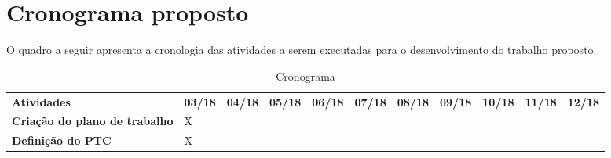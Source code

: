 \chapter{Cronograma proposto}

O quadro a seguir apresenta a cronologia das atividades a serem executadas para o desenvolvimento do trabalho proposto.


\begin{table}[h]
\caption{Cronograma}
 \centering
 {\renewcommand\arraystretch{1.25}
 \begin{tabular}{ l l l l l l l l l l l }
  \cline{1-1}\cline{2-2}\cline{3-3}\cline{4-4}\cline{5-5}\cline{6-6}\cline{7-7}\cline{8-8}\cline{9-9}\cline{10-10}\cline{11-11}  
    \multicolumn{1}{|p{4.283cm}|}{\textbf{Atividades} \centering } &
    \multicolumn{1}{p{0.709cm}|}{\textbf{03/18} \centering } &
    \multicolumn{1}{p{0.709cm}|}{\textbf{04/18} \centering } &
    \multicolumn{1}{p{0.709cm}|}{\textbf{05/18} \centering } &
    \multicolumn{1}{p{0.709cm}|}{\textbf{06/18} \centering } &
    \multicolumn{1}{p{0.709cm}|}{\textbf{07/18} \centering } &
    \multicolumn{1}{p{0.709cm}|}{\textbf{08/18} \centering } &
    \multicolumn{1}{p{0.709cm}|}{\textbf{09/18} \centering } &
    \multicolumn{1}{p{0.709cm}|}{\textbf{10/18} \centering } &
    \multicolumn{1}{p{0.709cm}|}{\textbf{11/18} \centering } &
    \multicolumn{1}{p{0.709cm}|}{\textbf{12/18} \centering }
  \\  
  \cline{1-1}\cline{2-2}\cline{3-3}\cline{4-4}\cline{5-5}\cline{6-6}\cline{7-7}\cline{8-8}\cline{9-9}\cline{10-10}\cline{11-11}  
    \multicolumn{1}{|p{4.283cm}|}{\textbf{Criação do plano de trabalho}} &
    \multicolumn{1}{p{0.709cm}|}{X \centering } &
    \multicolumn{1}{p{0.709cm}|}{  \centering } &
    \multicolumn{1}{p{0.709cm}|}{  \centering } &
    \multicolumn{1}{p{0.709cm}|}{  \centering } &
    \multicolumn{1}{p{0.709cm}|}{  \centering } &
    \multicolumn{1}{p{0.709cm}|}{  \centering } &
    \multicolumn{1}{p{0.709cm}|}{  \centering } &
    \multicolumn{1}{p{0.709cm}|}{  \centering } &
    \multicolumn{1}{p{0.709cm}|}{  \centering } &
    \multicolumn{1}{p{0.709cm}|}{  \centering }
  \\  
  \cline{1-1}\cline{2-2}\cline{3-3}\cline{4-4}\cline{5-5}\cline{6-6}\cline{7-7}\cline{8-8}\cline{9-9}\cline{10-10}\cline{11-11}  
    \multicolumn{1}{|p{4.283cm}|}{\textbf{Definição do PTC}} &
    \multicolumn{1}{p{0.709cm}|}{X \centering } &
    \multicolumn{1}{p{0.709cm}|}{  \centering } &
    \multicolumn{1}{p{0.709cm}|}{  \centering } &

\end{tabular}}
\end{table}
